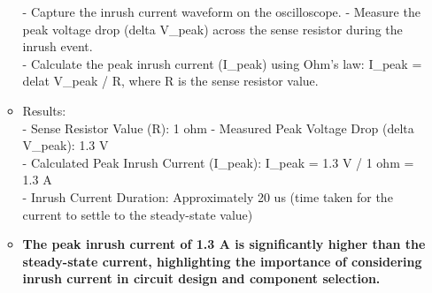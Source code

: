 \documentclass[a4paper,11pt]{article}%
\begin{document}
\begin{enumerate}
\begin{itemize}
		            - Capture the inrush current waveform on the oscilloscope. - Measure the peak voltage drop (delta V\_peak) across the sense resistor during the inrush event. \\
		            - Calculate the peak inrush current (I\_peak) using Ohm's law: I\_peak = delat V\_peak / R, where R is the sense resistor value.
		      \item Results: \\
		            - Sense Resistor Value (R): 1 ohm - Measured Peak Voltage Drop (delta V\_peak): 1.3 V \\
		            - Calculated Peak Inrush Current (I\_peak): I\_peak = 1.3 V / 1 ohm = 1.3 A \\
		            - Inrush Current Duration: Approximately 20 us (time taken for the current to settle to the steady-state value)\\
		      \item \textbf{The peak inrush current of 1.3 A is significantly higher than the steady-state current, highlighting the importance of considering inrush current in circuit design and component selection.}


\end{itemize}
\end{enumerate}
\end{document}

